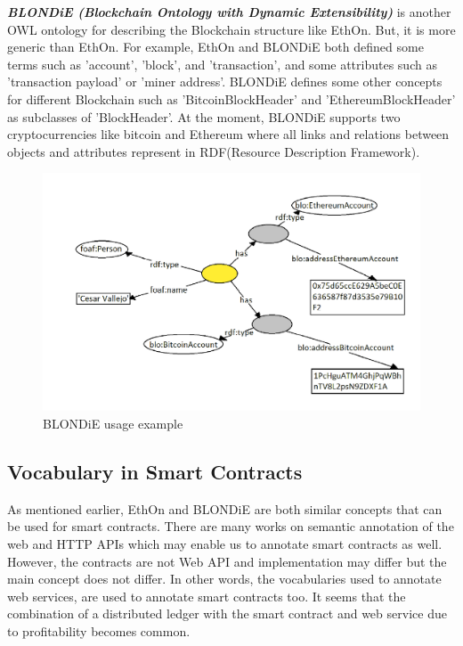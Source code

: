 \begin{center}
\begin{figure}[htb!]
		
	\end{figure}
	
\end{center}
\textbf{\textit{BLONDiE (Blockchain Ontology with Dynamic Extensibility)}} is another OWL ontology for describing the Blockchain structure like EthOn. But, it is more generic than EthOn. For example, EthOn and BLONDiE both defined some terms such as 'account', 'block', and 'transaction', and some attributes such as 'transaction payload' or 'miner address'. BLONDiE defines some other concepts for different Blockchain such as 'BitcoinBlockHeader' and 'EthereumBlockHeader' as subclasses of 'BlockHeader'. At the moment, BLONDiE supports two cryptocurrencies like bitcoin and Ethereum where all links and relations between objects and attributes represent in RDF(Resource Description Framework)\cite{Third}.
\begin{center}
	\begin{figure}[htb!]
		
		\begin{minipage}{0.55\linewidth}
			\centering
			\includegraphics[width=1.75\textwidth]{images/chap02_BLONDiE.png}
		\end{minipage}
		\caption[BLONDiE]{BLONDiE usage example\cite{Hector}}
		
		
	\end{figure}
	
\end{center}
\subsection{Vocabulary in Smart Contracts}
As mentioned earlier, EthOn and BLONDiE are both similar concepts that can be used for smart contracts. There are many works on semantic annotation of the web and HTTP APIs which may enable us to annotate smart contracts as well. However, the contracts are not Web API and implementation may differ but the main concept does not differ. In other words, the vocabularies used to annotate web services, are used to annotate smart contracts too. It seems that the combination of a distributed ledger with the smart contract and web service due to profitability becomes common\cite{Third}.

